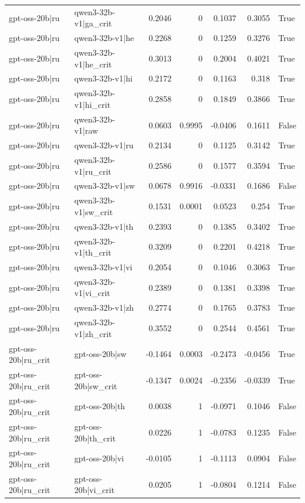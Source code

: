 \begin{table}
\begin{tabular}{l l r r r r l}
gpt-oss-20b|ru & qwen3-32b-v1|ga_crit & 0.2046 & 0 & 0.1037 & 0.3055 & True \\
gpt-oss-20b|ru & qwen3-32b-v1|he & 0.2268 & 0 & 0.1259 & 0.3276 & True \\
gpt-oss-20b|ru & qwen3-32b-v1|he_crit & 0.3013 & 0 & 0.2004 & 0.4021 & True \\
gpt-oss-20b|ru & qwen3-32b-v1|hi & 0.2172 & 0 & 0.1163 & 0.318 & True \\
gpt-oss-20b|ru & qwen3-32b-v1|hi_crit & 0.2858 & 0 & 0.1849 & 0.3866 & True \\
gpt-oss-20b|ru & qwen3-32b-v1|raw & 0.0603 & 0.9995 & -0.0406 & 0.1611 & False \\
gpt-oss-20b|ru & qwen3-32b-v1|ru & 0.2134 & 0 & 0.1125 & 0.3142 & True \\
gpt-oss-20b|ru & qwen3-32b-v1|ru_crit & 0.2586 & 0 & 0.1577 & 0.3594 & True \\
gpt-oss-20b|ru & qwen3-32b-v1|sw & 0.0678 & 0.9916 & -0.0331 & 0.1686 & False \\
gpt-oss-20b|ru & qwen3-32b-v1|sw_crit & 0.1531 & 0.0001 & 0.0523 & 0.254 & True \\
gpt-oss-20b|ru & qwen3-32b-v1|th & 0.2393 & 0 & 0.1385 & 0.3402 & True \\
gpt-oss-20b|ru & qwen3-32b-v1|th_crit & 0.3209 & 0 & 0.2201 & 0.4218 & True \\
gpt-oss-20b|ru & qwen3-32b-v1|vi & 0.2054 & 0 & 0.1046 & 0.3063 & True \\
gpt-oss-20b|ru & qwen3-32b-v1|vi_crit & 0.2389 & 0 & 0.1381 & 0.3398 & True \\
gpt-oss-20b|ru & qwen3-32b-v1|zh & 0.2774 & 0 & 0.1765 & 0.3783 & True \\
gpt-oss-20b|ru & qwen3-32b-v1|zh_crit & 0.3552 & 0 & 0.2544 & 0.4561 & True \\
gpt-oss-20b|ru_crit & gpt-oss-20b|sw & -0.1464 & 0.0003 & -0.2473 & -0.0456 & True \\
gpt-oss-20b|ru_crit & gpt-oss-20b|sw_crit & -0.1347 & 0.0024 & -0.2356 & -0.0339 & True \\
gpt-oss-20b|ru_crit & gpt-oss-20b|th & 0.0038 & 1 & -0.0971 & 0.1046 & False \\
gpt-oss-20b|ru_crit & gpt-oss-20b|th_crit & 0.0226 & 1 & -0.0783 & 0.1235 & False \\
gpt-oss-20b|ru_crit & gpt-oss-20b|vi & -0.0105 & 1 & -0.1113 & 0.0904 & False \\
gpt-oss-20b|ru_crit & gpt-oss-20b|vi_crit & 0.0205 & 1 & -0.0804 & 0.1214 & False \\

\end{tabular}
\end{table}
